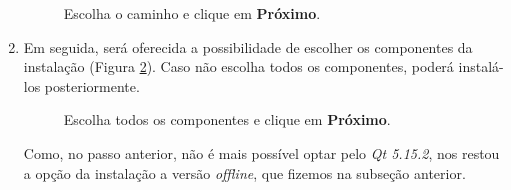 \documentclass[a4paper,11pt]{article}
\newcommand{\qtfive}{\textit{Qt 5.15.2}}
\begin{document}
\begin{enumerate}
\begin{figure}[H]
	\centering
	\caption{ Escolha o caminho e clique em \textbf{Próximo}.}
	\label{fig:qt_download_path}
\end{figure}

\item Em seguida, será oferecida a possibilidade de escolher os componentes da instalação (Figura \ref{fig:qt_inst_modules}). Caso não escolha todos os componentes, poderá instalá-los posteriormente.

\begin{figure}[H]
	\centering
	\caption{ Escolha todos os componentes e clique em \textbf{Próximo}.}
	\label{fig:qt_inst_modules}
\end{figure}

Como, no passo anterior, não é mais possível optar pelo \qtfive{}, nos restou a opção da instalação a versão \textit{offline}, que fizemos na subseção anterior.


\end{enumerate}
\end{document}

